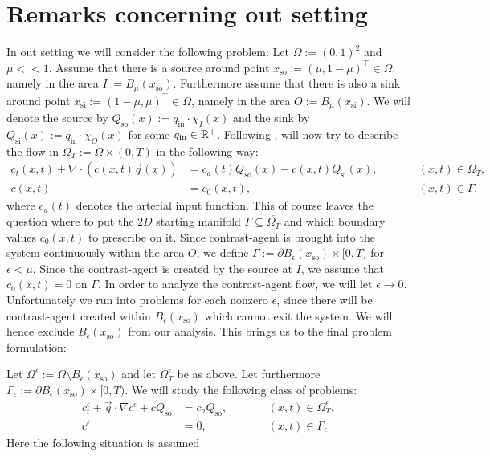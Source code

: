 \documentclass[paper=a4, fontsize=12pt,parskip=half,draft,headings=small]{scrartcl}
\newcommand{\qi}{q_{\mathrm{in}}}
\newcommand{\Qso}{Q_{\mathrm{so}}}
\newcommand{\Qsi}{Q_{\mathrm{si}}}
\newcommand{\q}{\vec{q}}
\newcommand{\xso}{x_\mathrm{so}}
\newcommand{\xsi}{x_\mathrm{si}}
\newcommand{\ce}{c^\epsilon}
\begin{document}
		
		\section{Remarks concerning out setting}
		
		\begin{remark}\label{rem:Equation}
			In out setting we will consider the following problem:
			Let $\Omega:=(0,1)^2$ and $\mu <<1$.
			Assume that there is a source around point $\xso:=(\mu,1-\mu)^\top \in \Omega$, namely in the area $I:=B_{\mu}(\xso)$.
			Furthermore assume that there is also a sink around point $\xsi:=(1-\mu,\mu)^\top \in \Omega$, namely in the area $O:=B_{\mu}(\xsi)$.
			We will denote the source by $\Qso(x):=\qi\cdot\chi_I(x)$ and the sink by $\Qsi(x):=\qi\cdot\chi_O(x)$ for some $\qi \in \R^+$.
			Following \cite{BergenMIC15}, will now try to describe the flow in $\Omega_T:=\Omega \times (0,T)$ in the following way:
			\begin{subequations}
				\label{eq:ourMainProblem}
				\begin{alignat}{2}
					c_t(x,t) + \nabla \cdot \left(c(x,t)\q(x) \right) &= c_a(t)\Qso(x) - c(x,t)\Qsi(x), &\qquad  &(x,t) \in \Omega_T, \\
					c(x,t) &= c_0(x,t), && (x,t) \in \Gamma,
				\end{alignat}
			\end{subequations}
			where $c_a(t)$ denotes the arterial input function.
			This of course leaves the question where to put the $2D$ starting manifold $\Gamma \subseteq \overline{\Omega_T}$ and which boundary values $c_0(x,t)$ to prescribe on it.
			Since contrast-agent is brought into the system continuously within the area $O$, we define $\Gamma:= \partial B_\epsilon(\xso) \times [0,T)$ for $\epsilon < \mu$.
			Since the contrast-agent is created by the source at $I$, we assume that $c_0(x,t) = 0$ on $\Gamma$.
			In order to analyze the contrast-agent flow, we will let $\epsilon \to 0$.
			Unfortunately we run into problems for each nonzero $\epsilon$, since there will be contrast-agent created within $B_\epsilon(\xso)$ which cannot exit the system.
			We will hence exclude $B_\epsilon(\xso)$ from our analysis. This brings us to the final problem formulation:

			Let $\Omega^\epsilon:=\Omega \setminus \overline{B_\epsilon(\xso)}$ and let $\Omega^\epsilon_T$ be as above.
			Let furthermore $\Gamma_\epsilon:= \partial B_\epsilon(\xso) \times [0,T)$.
			We will study the following class of problems:
			\begin{subequations}
				\label{eq:ourProblem}
				\begin{alignat}{2}
					\ce_t + \q \cdot \nabla \ce + c\Qso &= c_a\Qso, &\qquad  &(x,t) \in \Omega_T^\epsilon, \label{eq:ourProblema} \\
					\ce &= 0, && (x,t) \in \Gamma_\epsilon \label{eq:ourProblemb}
				\end{alignat}
			\end{subequations}
			Here the following situation is assumed
			

\end{remark}
\end{document}
